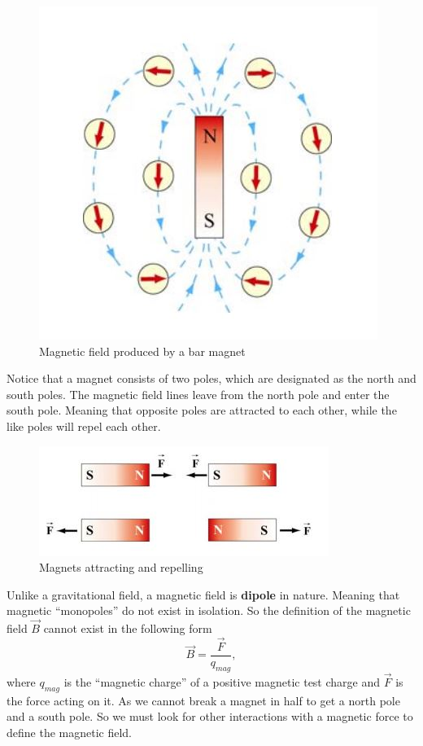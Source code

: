 \begin{figure}[h!]
    \centering
    \includegraphics[scale=0.6]{notes/images/Magnetism-1.JPG}
    \caption{Magnetic field produced by a bar magnet}
    \label{fig:bar-magnet}
\end{figure}
\FloatBarrier

Notice that a magnet consists of two poles, which are designated as the north and south poles. The magnetic field lines leave from the north pole and enter the south pole. Meaning that opposite poles are attracted to each other, while the like poles will repel each other. 

\begin{figure}[h!]
    \centering
    \includegraphics{notes/images/Magnetism-2.JPG}
    \caption{Magnets attracting and repelling}
\end{figure}
\FloatBarrier

Unlike a gravitational field, a magnetic field is \textbf{dipole} in nature. Meaning that magnetic ``monopoles'' do not exist in isolation. So the definition of the magnetic field $\vec{B}$ cannot exist in the following form
\begin{equation}
    \vec{B} = \frac{\vec{F}}{q_{mag}},
\end{equation}
where $q_{mag}$ is the ``magnetic charge'' of a positive magnetic test charge and $\vec{F}$ is the force acting on it. As we cannot break a magnet in half to get a north pole and a south pole. So we must look for other interactions with a magnetic force to define the magnetic field. 


